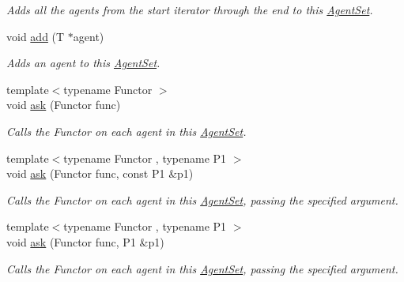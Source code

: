 \begin{DoxyCompactItemize}
\begin{DoxyCompactList}\small\item\em Adds all the agents from the start iterator through the end to this \hyperlink{classrepast_1_1relogo_1_1_agent_set}{Agent\-Set}. \end{DoxyCompactList}\item 
\hypertarget{classrepast_1_1relogo_1_1_agent_set_a2b06374a28dd6ee8d7d9c8a7ebf8d8a8}{void \hyperlink{classrepast_1_1relogo_1_1_agent_set_a2b06374a28dd6ee8d7d9c8a7ebf8d8a8}{add} (T $\ast$agent)}\label{classrepast_1_1relogo_1_1_agent_set_a2b06374a28dd6ee8d7d9c8a7ebf8d8a8}

\begin{DoxyCompactList}\small\item\em Adds an agent to this \hyperlink{classrepast_1_1relogo_1_1_agent_set}{Agent\-Set}. \end{DoxyCompactList}\item 
{\footnotesize template$<$typename Functor $>$ }\\void \hyperlink{classrepast_1_1relogo_1_1_agent_set_a5caff8a45e775403881012e105030134}{ask} (Functor func)
\begin{DoxyCompactList}\small\item\em Calls the Functor on each agent in this \hyperlink{classrepast_1_1relogo_1_1_agent_set}{Agent\-Set}. \end{DoxyCompactList}\item 
{\footnotesize template$<$typename Functor , typename P1 $>$ }\\void \hyperlink{classrepast_1_1relogo_1_1_agent_set_a21561fa480f0dbaa059753815fbe7821}{ask} (Functor func, const P1 \&p1)
\begin{DoxyCompactList}\small\item\em Calls the Functor on each agent in this \hyperlink{classrepast_1_1relogo_1_1_agent_set}{Agent\-Set}, passing the specified argument. \end{DoxyCompactList}\item 
{\footnotesize template$<$typename Functor , typename P1 $>$ }\\void \hyperlink{classrepast_1_1relogo_1_1_agent_set_a2af4658a4ca1205fba7225064d736d42}{ask} (Functor func, P1 \&p1)
\begin{DoxyCompactList}\small\item\em Calls the Functor on each agent in this \hyperlink{classrepast_1_1relogo_1_1_agent_set}{Agent\-Set}, passing the specified argument. \end{DoxyCompactList}\item 

\end{DoxyCompactItemize}
